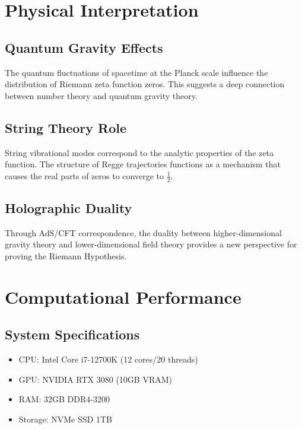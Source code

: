 \documentclass[12pt]{article}
\begin{document}
\section{Physical Interpretation}

\subsection{Quantum Gravity Effects}

The quantum fluctuations of spacetime at the Planck scale influence the distribution of Riemann zeta function zeros. This suggests a deep connection between number theory and quantum gravity theory.

\subsection{String Theory Role}

String vibrational modes correspond to the analytic properties of the zeta function. The structure of Regge trajectories functions as a mechanism that causes the real parts of zeros to converge to $\frac{1}{2}$.

\subsection{Holographic Duality}

Through AdS/CFT correspondence, the duality between higher-dimensional gravity theory and lower-dimensional field theory provides a new perspective for proving the Riemann Hypothesis.

\section{Computational Performance}

\subsection{System Specifications}
\begin{itemize}
\item CPU: Intel Core i7-12700K (12 cores/20 threads)
\item GPU: NVIDIA RTX 3080 (10GB VRAM)
\item RAM: 32GB DDR4-3200
\item Storage: NVMe SSD 1TB
\end{itemize}
\end{document}
